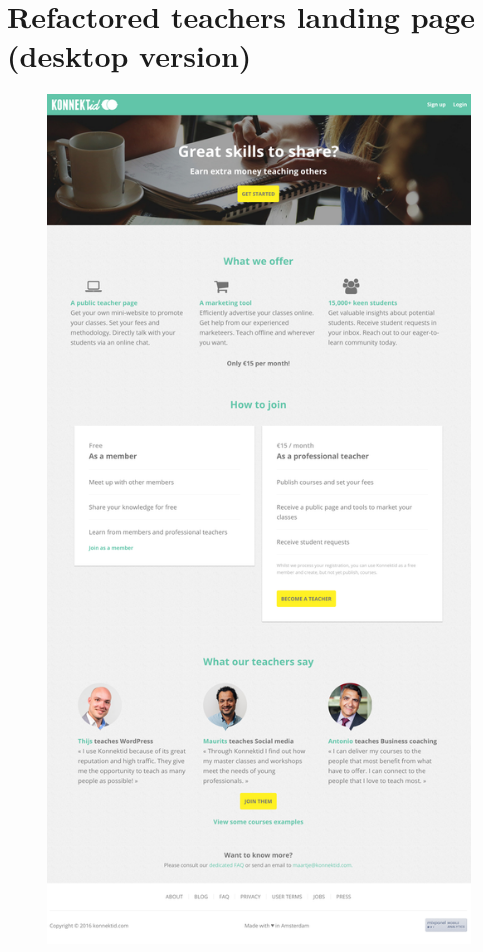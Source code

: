 \newpage

\section{Refactored teachers landing page (desktop version)}
\label{sec:teachersPage}

\begin{figure}[H]
    \centering
    \includegraphics[scale=0.2]{figure/teachersPage.png}
\end{figure}

